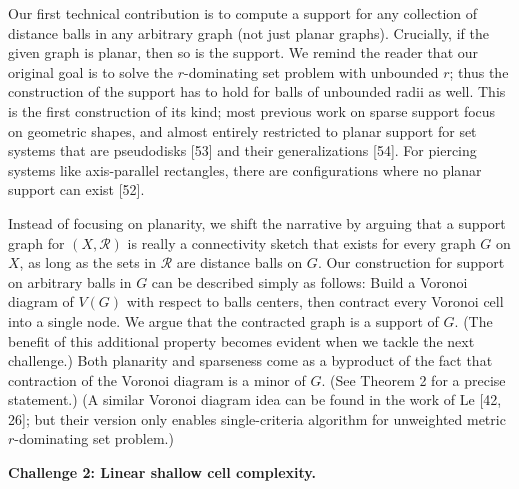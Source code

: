 \documentclass[10pt,a4paper]{article}
\begin{document}
\par
\par
Our first technical contribution is to compute a support for any collection of distance balls in any arbitrary graph (not just planar graphs). Crucially, if the given graph is planar, then so is the support. We remind the reader that our original goal is to solve the $r$-dominating set problem with unbounded $r$; thus the construction of the support has to hold for balls of unbounded radii as well. This is the first construction of its kind; most previous work on sparse support focus on geometric shapes, and almost entirely restricted to planar support for set systems that are pseudodisks [53] and their generalizations [54]. For piercing systems like axis-parallel rectangles, there are configurations where no planar support can exist [52].
\par
\par
Instead of focusing on planarity, we shift the narrative by arguing that a support graph for $(X,\mathcal{R})$ is really a connectivity sketch that exists for every graph $G$ on $X$, as long as the sets in $\mathcal{R}$ are distance balls on $G$. Our construction for support on arbitrary balls in $G$ can be described simply as follows: Build a Voronoi diagram of $V(G)$ with respect to balls centers, then contract every Voronoi cell into a single node. We argue that the contracted graph is a support of $G$. (The benefit of this additional property becomes evident when we tackle the next challenge.) Both planarity and sparseness come as a byproduct of the fact that contraction of the Voronoi diagram is a minor of $G$. (See Theorem 2 for a precise statement.) (A similar Voronoi diagram idea can be found in the work of Le [42, 26]; but their version only enables single-criteria algorithm for unweighted metric $r$-dominating set problem.)
\par
\par
\par\medskip\noindent\textbf{Challenge 2: Linear shallow cell complexity.}\par
\end{document}
